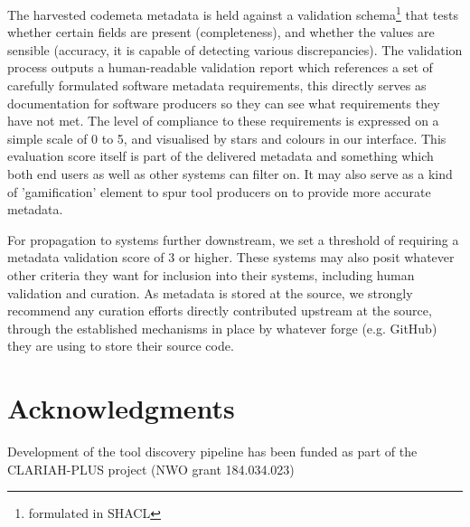 \documentclass[a4paper,11pt]{article}
\begin{document}
The harvested codemeta metadata is held against a validation
schema\footnote{formulated in SHACL} that tests whether certain fields are
present (completeness), and whether the values are sensible (accuracy, it is
capable of detecting various discrepancies). The validation process outputs a
human-readable validation report which references a set of carefully formulated
software metadata requirements, this directly serves as documentation for
software producers so they can see what requirements they have not met. The
level of compliance to these requirements is expressed on a simple scale of 0
to 5, and visualised by stars and colours in our interface. This evaluation
score itself is part of the delivered metadata and something which both end
users as well as other systems can filter on. It may also serve as a kind of
'gamification' element to spur tool producers on to provide more accurate
metadata. 

For propagation to systems further downstream, we set a threshold of requiring
a metadata validation score of 3 or higher. These systems may also posit
whatever other criteria they want for inclusion into their systems, including
human validation and curation. As metadata is stored at the source, we strongly
recommend any curation efforts directly contributed upstream at the source,
through the established mechanisms in place by whatever forge (e.g. GitHub)
they are using to store their source code.

\section*{Acknowledgments}

Development of the tool discovery pipeline has been funded as part of the CLARIAH-PLUS project (NWO grant 184.034.023) 

\printbibliography
\end{document}
